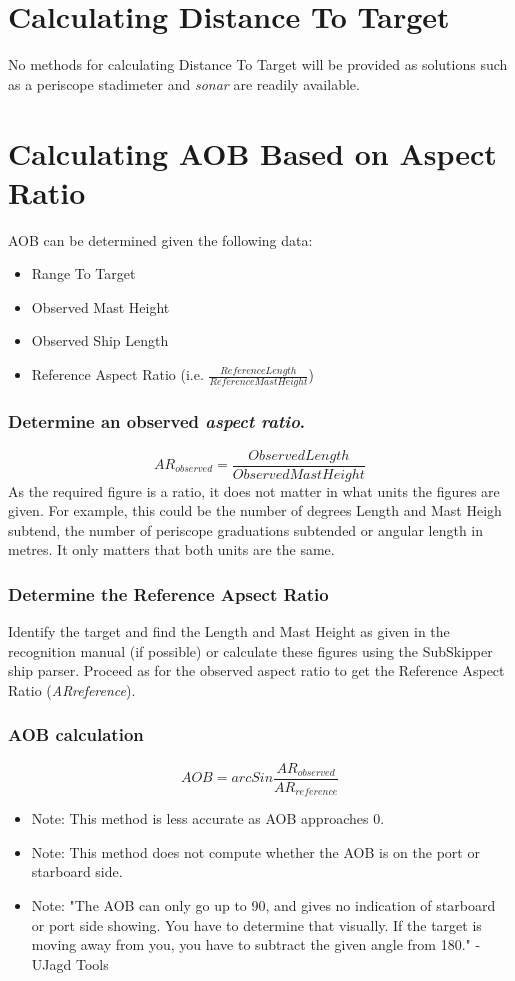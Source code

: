 \documentclass{article}
\begin{document}
\section{Calculating Distance To Target}

No methods for calculating Distance To Target will be provided as solutions such as a periscope stadimeter and \emph{sonar} are readily available.

\section{Calculating AOB Based on Aspect Ratio}

AOB can be determined given the following data:
\begin{itemize}
\item{Range To Target}
\item{Observed Mast Height}
\item{Observed Ship Length}
\item{Reference Aspect Ratio (i.e. $\frac{Reference Length}{Reference Mast Height}$)}
\end{itemize}

\subsubsection{Determine an observed \emph{aspect ratio}.}
$$AR_{observed} = \frac{Observed Length}{Observed Mast Height}$$
As the required figure is a ratio, it does not matter in what units the figures are given. For example, this could be the number of degrees Length and Mast Heigh subtend, the number of periscope graduations subtended or angular length in metres. It only matters that both units are the same.

\subsubsection{Determine the Reference Apsect Ratio}
Identify the target and find the Length and Mast Height as given in the recognition manual (if possible) or calculate these figures using the SubSkipper ship parser. Proceed as for the observed aspect ratio to get the Reference Aspect Ratio (\emph{ARreference}).

\subsubsection{AOB calculation}
$$AOB = arcSin \frac{AR_{observed}}{AR_{reference}}$$

\begin{itemize}
\item{Note: This method is less accurate as AOB approaches 0.}
\item{Note: This method does not compute whether the AOB is on the port or starboard side.}
\item{Note: "The AOB can only go up to 90, and gives no indication of starboard or port side showing. You have to determine that visually. If the target is moving away from you, you have to subtract the given angle from 180." -UJagd Tools}
\end{itemize}
\end{document}
